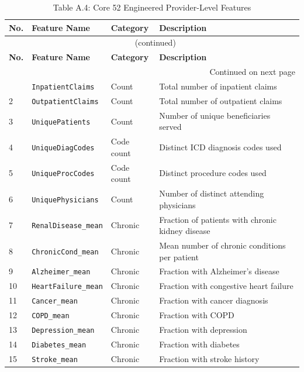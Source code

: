 \begin{longtable}{p{0.8cm}p{4.6cm}p{2.5cm}p{6.0cm}}
\caption{Table A.4: Core 52 Engineered Provider-Level Features}
\label{tab:features52} \\
\toprule
\textbf{No.} & \textbf{Feature Name} & \textbf{Category} & \textbf{Description} \\
\midrule
\endfirsthead
\multicolumn{4}{c}{\tablename\ \thetable{} (continued)} \\
\toprule
\textbf{No.} & \textbf{Feature Name} & \textbf{Category} & \textbf{Description} \\
\midrule
\endhead
\midrule
\multicolumn{4}{r}{\small Continued on next page} \\
\endfoot
\bottomrule
\endlastfoot
1  & \texttt{InpatientClaims}      & Count     & Total number of inpatient claims \\
2  & \texttt{OutpatientClaims}     & Count     & Total number of outpatient claims \\
3  & \texttt{UniquePatients}       & Count     & Number of unique beneficiaries served \\
4  & \texttt{UniqueDiagCodes}      & Code count & Distinct ICD diagnosis codes used \\
5  & \texttt{UniqueProcCodes}      & Code count & Distinct procedure codes used \\
6  & \texttt{UniquePhysicians}     & Count     & Number of distinct attending physicians \\
7  & \texttt{RenalDisease\_mean}   & Chronic   & Fraction of patients with chronic kidney disease \\
8  & \texttt{ChronicCond\_mean}    & Chronic   & Mean number of chronic conditions per patient \\
9  & \texttt{Alzheimer\_mean}      & Chronic   & Fraction with Alzheimer's disease \\
10 & \texttt{HeartFailure\_mean}   & Chronic   & Fraction with congestive heart failure \\
11 & \texttt{Cancer\_mean}         & Chronic   & Fraction with cancer diagnosis \\
12 & \texttt{COPD\_mean}           & Chronic   & Fraction with COPD \\
13 & \texttt{Depression\_mean}     & Chronic   & Fraction with depression \\
14 & \texttt{Diabetes\_mean}       & Chronic   & Fraction with diabetes \\
15 & \texttt{Stroke\_mean}         & Chronic   & Fraction with stroke history \\

\end{longtable}
